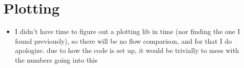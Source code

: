 \documentclass{article}
\begin{document}
\section{Plotting}
\label{sec-2}
\begin{itemize}
\item I didn't have time to figure out a plotting lib in time (nor finding
the one Ι found previously), so there will be no flow comparison, and
for that I do apologize. due to how the code is set up, it would be
trivially to mess with the numbers going into this
\end{itemize}
\end{document}
